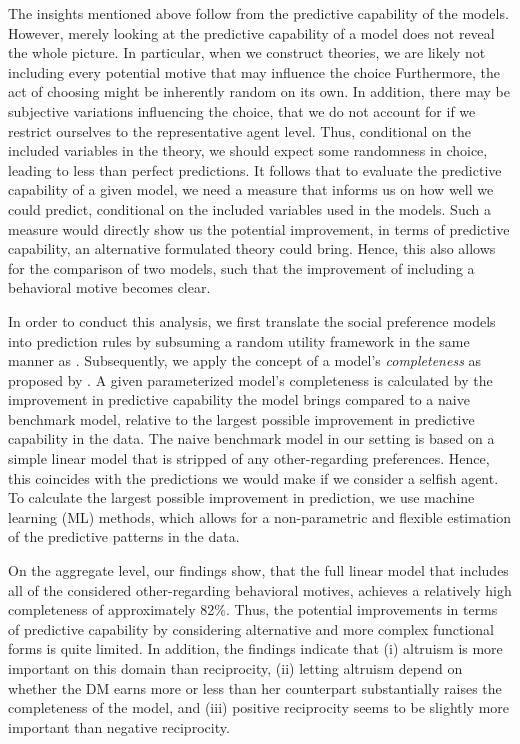 \documentclass[11pt,a4paper]{article}
\theoremstyle{definition}
\begin{document}
The insights mentioned above follow from the predictive capability of the models. However, merely looking at the predictive capability of a model does not reveal the whole picture. In particular, when we construct theories, we are likely not including every potential motive that may influence the choice Furthermore, the act of choosing might be inherently random on its own. In addition, there may be subjective variations influencing the choice, that we do not account for if we restrict ourselves to the representative agent level. Thus, conditional on the included variables in the theory, we should expect some randomness in choice, leading to less than perfect predictions. It follows that to evaluate the predictive capability of a given model, we need a measure that informs us on how well we could predict, conditional on the included variables used in the models. Such a measure would directly show us the potential improvement, in terms of predictive capability, an alternative formulated theory could bring. Hence, this also allows for the comparison of two models, such that the improvement of including a behavioral motive becomes clear.

In order to conduct this analysis, we first translate the social preference models into prediction rules by subsuming a random utility framework in the same manner as \cite{Bruhin2019}. Subsequently, we apply the concept of a model's \emph{completeness} as proposed by \cite{Fudenberg2021b}. A given parameterized model's completeness is calculated by the improvement in predictive capability the model brings compared to a naive benchmark model, relative to the largest possible improvement in predictive capability in the data. The naive benchmark model in our setting is based on a simple linear model that is stripped of any other-regarding preferences. Hence, this coincides with the predictions we would make if we consider a selfish agent. To calculate the largest possible improvement in prediction, we use machine learning (ML) methods, which allows for a non-parametric and flexible estimation of the predictive patterns in the data.

On the aggregate level, our findings show, that the full linear model that includes all of the considered other-regarding behavioral motives, achieves a relatively high completeness of approximately 82\%. Thus, the potential improvements in terms of predictive capability by considering alternative and more complex functional forms is quite limited. In addition, the findings indicate that (i) altruism is more important on this domain than reciprocity, (ii) letting altruism depend on whether the DM earns more or less than her counterpart substantially raises the completeness of the model, and (iii) positive reciprocity seems to be slightly more important than negative reciprocity.
\end{document}
